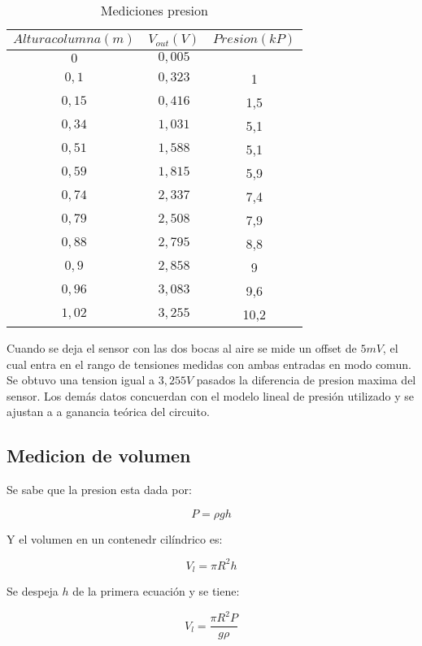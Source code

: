 \begin{table}[H]
\centering
\begin{tabular}{ccc}\hline
$Altura columna(m)$ & $V_{out}(V)$ & $Presion(kP)$ \\
\hline
$0$   & $0,005$ &   \\
$0,1$  & $0,323$ & 1 \\
$0,15$  & $0,416$ & 1,5 \\
$0,34$  & $1,031$ & 5,1 \\
$0,51$  & $1,588$ & 5,1\\
$0,59$  & $1,815$ & 5,9\\
$0,74$  & $2,337$ & 7,4\\
$0,79$  & $2,508$ & 7,9\\
$0,88$  & $2,795$ & 8,8\\
$0,9$  & $2,858$ & 9\\
$0,96$  & $3,083$ & 9,6\\
$1,02$  & $3,255$ & 10,2\\ \hline
\end{tabular}
\caption{Mediciones presion}
\label{table:presion}
\end{table}

Cuando se deja el sensor con las dos bocas al aire se mide un offset de $5mV$, el cual entra en el rango de tensiones medidas con ambas entradas en modo comun. Se obtuvo una tension igual a $3,255V$ pasados la diferencia de presion maxima del sensor. Los dem\'as datos concuerdan con el modelo lineal de presi\'on utilizado y se ajustan a a ganancia te\'orica del circuito.


\subsection{Medicion de volumen}

Se sabe que la presion esta dada por:

\begin{equation}
P = \rho gh 
\end{equation}

Y el volumen en un contenedr cil\'indrico es:
 
\begin{equation}
V_l = \pi R^2h 
\end{equation}

Se despeja $h$ de la primera ecuaci\'on y se tiene:

\begin{equation}\label{eq:volumen}
V_l = \frac{\pi R^2P}{g\rho}
\end{equation} 

